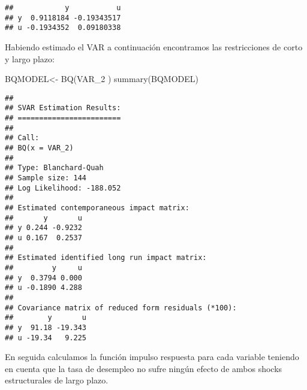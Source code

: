 \documentclass[
]{book}
\newenvironment{Shaded}{\begin{snugshade}}{\end{snugshade}}
\newcommand{\FunctionTok}[1]{\textcolor[rgb]{0.00,0.00,0.00}{#1}}
\newcommand{\NormalTok}[1]{#1}
\newcommand{\OtherTok}[1]{\textcolor[rgb]{0.56,0.35,0.01}{#1}}
\begin{document}
\begin{verbatim}
##            y           u
## y  0.9118184 -0.19343517
## u -0.1934352  0.09180338
\end{verbatim}

Habiendo estimado el VAR a continuación encontramos las restricciones de corto y largo plazo:

\begin{Shaded}
\begin{Highlighting}[]
\NormalTok{BQMODEL}\OtherTok{\textless{}{-}} \FunctionTok{BQ}\NormalTok{(VAR\_2 )}
\FunctionTok{summary}\NormalTok{(BQMODEL)}
\end{Highlighting}
\end{Shaded}

\begin{verbatim}
## 
## SVAR Estimation Results:
## ======================== 
## 
## Call:
## BQ(x = VAR_2)
## 
## Type: Blanchard-Quah 
## Sample size: 144 
## Log Likelihood: -188.052 
## 
## Estimated contemporaneous impact matrix:
##       y       u
## y 0.244 -0.9232
## u 0.167  0.2537
## 
## Estimated identified long run impact matrix:
##         y     u
## y  0.3794 0.000
## u -0.1890 4.288
## 
## Covariance matrix of reduced form residuals (*100):
##        y       u
## y  91.18 -19.343
## u -19.34   9.225
\end{verbatim}

En seguida calculamos la función impulso respuesta para cada variable teniendo en cuenta que la tasa de desempleo no sufre ningún efecto de ambos shocks estructurales de largo plazo.
\end{document}
